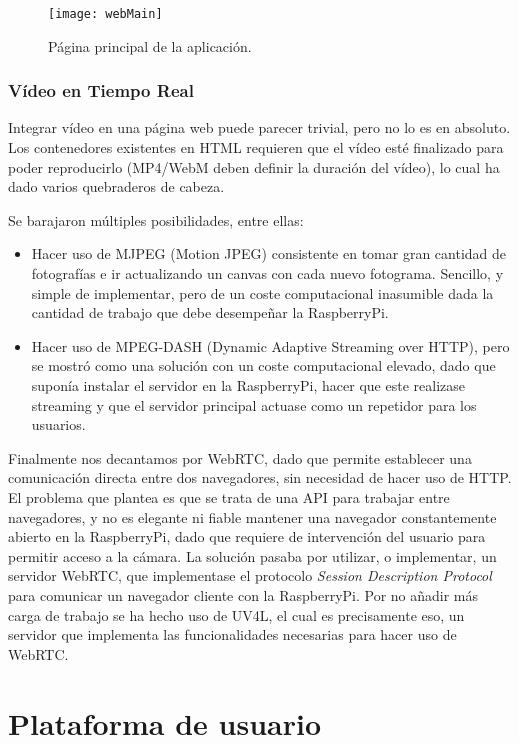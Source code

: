 \begin{figure}[H]
	\centering
	\texttt{[image: webMain]}
	\caption[Web index]{Página principal de la aplicación.}\label{fig:webmain}
\end{figure}

\subsubsection{Vídeo en Tiempo Real}

Integrar vídeo en una página web puede parecer trivial, pero no lo es en absoluto. Los contenedores existentes en HTML requieren que el vídeo esté finalizado para poder reproducirlo (MP4/WebM deben definir la duración del vídeo), lo cual ha dado varios quebraderos de cabeza. 

Se barajaron múltiples posibilidades, entre ellas:
\begin{itemize}
\item Hacer uso de MJPEG (Motion JPEG) consistente en tomar gran cantidad de fotografías e ir actualizando un canvas con cada nuevo fotograma. Sencillo, y simple de implementar, pero de un coste computacional inasumible dada la cantidad de trabajo que debe desempeñar la RaspberryPi.
\item Hacer uso de MPEG-DASH (Dynamic Adaptive Streaming over HTTP), pero se mostró como una solución con un coste computacional elevado, dado que suponía instalar el servidor en la RaspberryPi, hacer que este realizase streaming y que el servidor principal actuase como un repetidor para los usuarios.  
\end{itemize} 

Finalmente nos decantamos por WebRTC, dado que permite establecer una comunicación directa entre dos navegadores, sin necesidad de hacer uso de HTTP. El problema que plantea es que se trata de una API para trabajar entre navegadores, y no es elegante ni fiable mantener una navegador constantemente abierto en la RaspberryPi, dado que requiere de intervención del usuario para permitir acceso a la cámara. 
La solución pasaba por utilizar, o implementar, un servidor WebRTC, que implementase el protocolo \emph{Session Description Protocol} para comunicar un navegador cliente con la RaspberryPi. Por no añadir más carga de trabajo se ha hecho uso de UV4L, el cual es precisamente eso, un servidor que implementa las funcionalidades necesarias para hacer uso de WebRTC.

\section{Plataforma de usuario}

